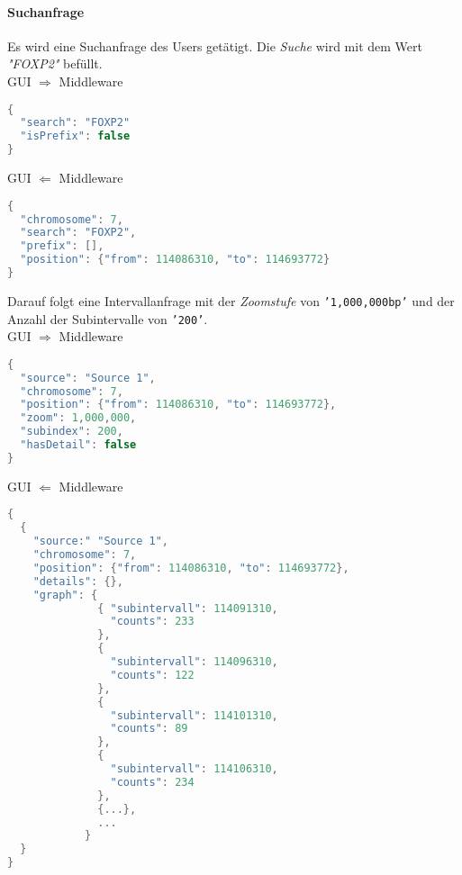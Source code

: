 \paragraph{Suchanfrage} Es wird eine Suchanfrage des Users getätigt. Die \textit{Suche} wird mit dem Wert \textit{"FOXP2"} befüllt.\\
\newline
GUI $\Rightarrow$ Middleware
\begin{lstlisting}[language=c,
commentstyle=\fontsize{12}{14.4}\selectfont,
basicstyle=\ttfamily\fontsize{10}{12}\selectfont, showstringspaces=false]
{
  "search": "FOXP2"
  "isPrefix": false
}
\end{lstlisting}
GUI $\Leftarrow$ Middleware
\begin{lstlisting}[language=c,
commentstyle=\fontsize{12}{14.4}\selectfont,
basicstyle=\ttfamily\fontsize{10}{12}\selectfont, showstringspaces=false]
{
  "chromosome": 7,
  "search": "FOXP2",
  "prefix": [],
  "position": {"from": 114086310, "to": 114693772}
}
\end{lstlisting}
Darauf folgt eine Intervallanfrage mit der \textit{Zoomstufe} von \texttt{'1,000,000bp'} und der Anzahl der Subintervalle von \texttt{'200'}.\\
\newline
GUI $\Rightarrow$ Middleware
\begin{lstlisting}[language=c,
commentstyle=\fontsize{12}{14.4}\selectfont,
basicstyle=\ttfamily\fontsize{10}{12}\selectfont, showstringspaces=false]
{
  "source": "Source 1",
  "chromosome": 7,
  "position": {"from": 114086310, "to": 114693772},
  "zoom": 1,000,000,
  "subindex": 200,
  "hasDetail": false
}
\end{lstlisting}
GUI $\Leftarrow$ Middleware
\begin{lstlisting}[language=c,
commentstyle=\fontsize{12}{14.4}\selectfont,
basicstyle=\ttfamily\fontsize{10}{12}\selectfont, showstringspaces=false]
{
  {
    "source:" "Source 1",
    "chromosome": 7,
    "position": {"from": 114086310, "to": 114693772},
    "details": {},
    "graph": {
              { "subintervall": 114091310,
                "counts": 233
              },
              {
                "subintervall": 114096310,
                "counts": 122
              },
              {
                "subintervall": 114101310,
                "counts": 89
              },
              {
                "subintervall": 114106310,
                "counts": 234
              },
              {...},
              ...
            }
  }
}
\end{lstlisting}


